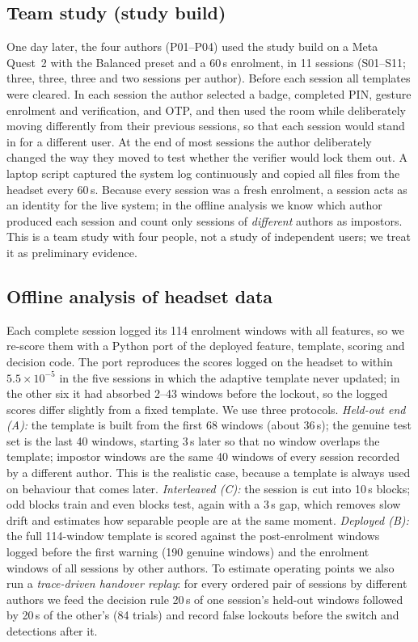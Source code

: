 \subsection{Team study (study build)}
One day later, the four authors (P01--P04) used the study build on a Meta Quest~2 with the Balanced preset and a 60\,s enrolment, in 11 sessions (S01--S11; three, three, three and two sessions per author). Before each session all templates were cleared. In each session the author selected a badge, completed PIN, gesture enrolment and verification, and OTP, and then used the room while deliberately moving differently from their previous sessions, so that each session would stand in for a different user. At the end of most sessions the author deliberately changed the way they moved to test whether the verifier would lock them out. A laptop script captured the system log continuously and copied all files from the headset every 60\,s. Because every session was a fresh enrolment, a session acts as an identity for the live system; in the offline analysis we know which author produced each session and count only sessions of \emph{different} authors as impostors. This is a team study with four people, not a study of independent users; we treat it as preliminary evidence.

\subsection{Offline analysis of headset data}
Each complete session logged its 114 enrolment windows with all features, so we re-score them with a Python port of the deployed feature, template, scoring and decision code. The port reproduces the scores logged on the headset to within $5.5\times10^{-5}$ in the five sessions in which the adaptive template never updated; in the other six it had absorbed 2--43 windows before the lockout, so the logged scores differ slightly from a fixed template. We use three protocols. \emph{Held-out end (A):} the template is built from the first 68 windows (about 36\,s); the genuine test set is the last 40 windows, starting 3\,s later so that no window overlaps the template; impostor windows are the same 40 windows of every session recorded by a different author. This is the realistic case, because a template is always used on behaviour that comes later. \emph{Interleaved (C):} the session is cut into 10\,s blocks; odd blocks train and even blocks test, again with a 3\,s gap, which removes slow drift and estimates how separable people are at the same moment. \emph{Deployed (B):} the full 114-window template is scored against the post-enrolment windows logged before the first warning (190 genuine windows) and the enrolment windows of all sessions by other authors. To estimate operating points we also run a \emph{trace-driven handover replay}: for every ordered pair of sessions by different authors we feed the decision rule 20\,s of one session's held-out windows followed by 20\,s of the other's (84 trials) and record false lockouts before the switch and detections after it.

